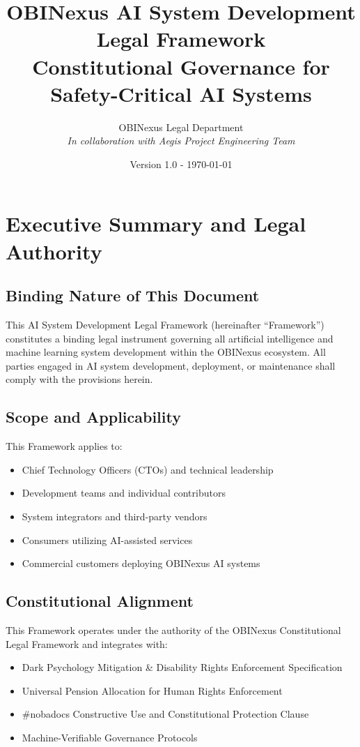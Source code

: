 \documentclass[12pt,a4paper]{article}
\title{\textbf{OBINexus AI System Development Legal Framework}\\
\Large Constitutional Governance for Safety-Critical AI Systems}
\author{OBINexus Legal Department\\
\textit{In collaboration with Aegis Project Engineering Team}}
\date{Version 1.0 - \today}
\begin{document}
\maketitle
\thispagestyle{empty}

\newpage
\tableofcontents
\newpage

\section{Executive Summary and Legal Authority}

\subsection{Binding Nature of This Document}

This AI System Development Legal Framework (hereinafter ``Framework'') constitutes a binding legal instrument governing all artificial intelligence and machine learning system development within the OBINexus ecosystem. All parties engaged in AI system development, deployment, or maintenance shall comply with the provisions herein.

\subsection{Scope and Applicability}

This Framework applies to:
\begin{itemize}
    \item Chief Technology Officers (CTOs) and technical leadership
    \item Development teams and individual contributors
    \item System integrators and third-party vendors
    \item Consumers utilizing AI-assisted services
    \item Commercial customers deploying OBINexus AI systems
\end{itemize}

\subsection{Constitutional Alignment}

This Framework operates under the authority of the OBINexus Constitutional Legal Framework and integrates with:
\begin{itemize}
    \item Dark Psychology Mitigation \& Disability Rights Enforcement Specification
    \item Universal Pension Allocation for Human Rights Enforcement
    \item \#nobadocs Constructive Use and Constitutional Protection Clause
    \item Machine-Verifiable Governance Protocols
\end{itemize}
\end{document}
